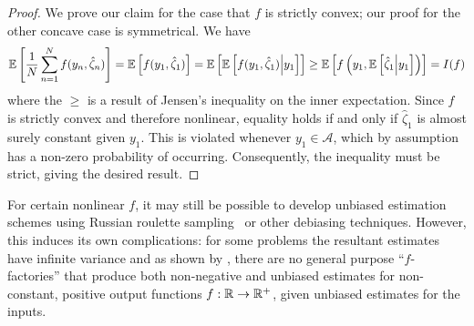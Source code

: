 \begin{proof}
	We prove our claim for the case that $f$ is strictly convex; our proof for the other concave case  
	is symmetrical. We have
	\begin{align*}
	\mathbb{E}\left[\frac{1}{N} \sum_{n=1}^N f(y_n, \hat{\zeta}_n)\right] = \mathbb{E}\left[f(y_1, \hat{\zeta}_1)\right] 
	= \mathbb{E}\left[\mathbb{E}\left[f(y_1, \hat{\zeta}_1) \middle| y_1\right]\right] 
	\ge \mathbb{E}\left[f\left(y_1, \mathbb{E}\left[\hat{\zeta}_1 \middle| y_1\right]\right)\right] = I(f)
	\end{align*}
	where the $\ge$ is a result of Jensen's inequality on the inner expectation.  
	Since $f$ is strictly convex and therefore nonlinear, equality holds if and only if
	$\hat{\zeta}_1$ is almost surely constant given $y_1$. 
	This is violated whenever $y_1 \in \mathcal{A}$, which by assumption
	has a non-zero probability of occurring.  Consequently,
	the inequality must be strict, giving the desired result.
\end{proof}
For certain nonlinear $f$, it may still be possible to develop unbiased estimation
schemes using Russian roulette sampling~\citep{lyne2015russian} or other debiasing techniques.  
However, this induces its own complications: for some problems the resultant estimates
have infinite variance \citep{lyne2015russian} and as shown by \cite{jacob2015nonnegative}, there are 
no general purpose ``$f$-factories'' that produce both non-negative and
unbiased estimates for non-constant, positive output functions $f : \mathbb{R} \rightarrow \mathbb{R}^+$,
given unbiased estimates for the inputs.

